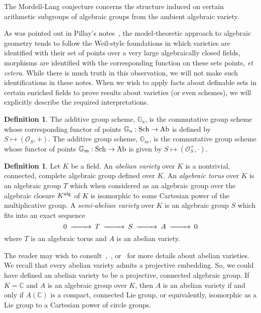\documentclass{amsart}
\newcommand{\Ga}{{{\mathbb G}_a}}
\newcommand{\Gm}{{{\mathbb G}_m}}
\newcommand{\CC}{{\mathbb C}}
\newcommand{\cO}{{\mathcal O}}
\newcommand{\alg}{{\rm alg}}
\theoremstyle{definition}
\newtheorem{Def}[thm]{Definition}
\theoremstyle{remark}
\begin{document}
The Mordell-Lang conjecture concerns the structure induced on certain 
arithmetic subgroups of algebraic groups from the ambient algebraic 
variety.  



As was pointed out in Pillay's notes~\cite{PiAWS}, the model-theoretic
approach to algebraic geometry tends to follow the Weil-style foundations
in which varieties are identified with their set of points over a very large
algebraically closed fields, morphisms are identified with the corresponding
function on these sets points, \emph{et cetera}.  While there is much truth
in this observation, we will not make such identifications in these notes.  
When we wish to apply facts about definable sets in certain enriched fields
to prove results about varieties (or even schemes), we will explicitly describe
the required interpretations.  

\begin{Def}
The additive group scheme, $\Ga$, is the commutative group scheme whose corresponding
functor of points $\Ga: {\rm Sch} \to {\rm Ab}$  is defined by $S \mapsto ({\mathcal O}_S, +)$.
The additive group scheme, $\Gm$, is the commutative group scheme whose
functor of points $\Gm: {\rm Sch} \to {\rm Ab}$ is given by $S \mapsto (\cO_S^\times, \cdot)$.
\end{Def}



\begin{Def}
Let $K$ be a field.  An \emph{abelian variety} over $K$ is a nontrivial, connected,
complete algebraic group defined over $K$.  An \emph{algebraic torus} over
$K$ is an algebraic group $T$ which when considered as an algebraic group
over the algebraic closure $K^\alg$ of $K$ is isomorphic to some Cartesian 
power of the multiplicative group.  A \emph{semi-abelian variety} over $K$ is
an algebraic group $S$ which fits into an exact sequence
$$\begin{CD} 0 @>>> T @>>> S @>>> A @>>> 0 \end{CD}$$ 
where $T$ is an algebraic torus and $A$ is an abelian variety.
\end{Def}

The reader may wish to consult~\cite{Mum},~\cite{LangAV}, or~\cite{Milne} for more details
about abelian varieties.  We recall that every abelian variety admits a projective
embedding.  So, we could have defined an abelian variety to be a projective, connected
algebraic group.  If $K = \CC$ and $A$ is an algebraic group over $K$, then 
$A$ is an abelian variety if and only if $A(\CC)$ is a compact, connected Lie group,
or equivalently, isomorphic as a Lie group to a Cartesian power of circle groups.  
\end{document}
